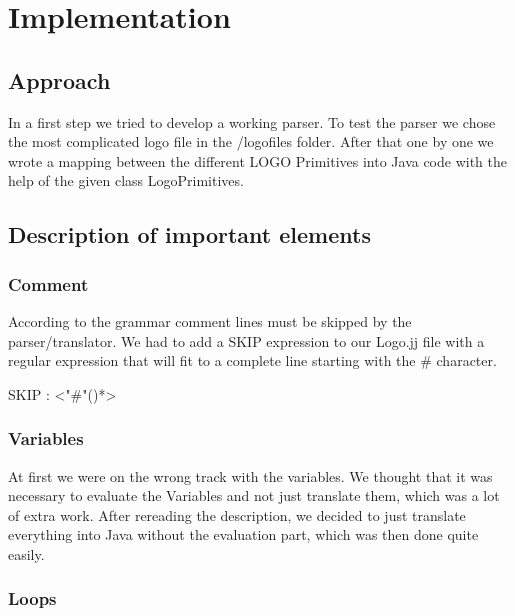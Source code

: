 \chapter{Implementation}
\label{chap:implementation}

\section{Approach}

In a first step we tried to develop a working parser. To test the parser we chose the most complicated logo file in the /logofiles folder. After that one by one we wrote a mapping between the different LOGO Primitives into Java code with the help of the given class LogoPrimitives.

\section{Description of important elements}

\subsection{Comment}

According to the grammar comment lines must be skipped by the parser/translator. We had to add a SKIP expression to our Logo.jj file with a regular expression that will fit to a complete line starting with the \# character.

\begin{center}
SKIP : { <"\#"(\texttildelow["\textbackslash n"])*>}
\end{center}

\subsection{Variables}
At first we were on the wrong track with the variables. We thought that it was necessary to evaluate the Variables and not just translate them, which was a lot of extra work. After rereading the description, we decided to just translate everything into Java without the evaluation part, which was then done quite easily.

\subsection{Loops}

